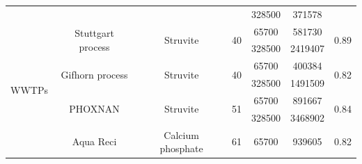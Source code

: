 \documentclass[authoryear]{elsarticle}
\begin{document}
\begin{table}[h]
{\begin{tabular}{@{}ccccccc@{}}
			&              &                    &                                                                                     & 328500                                                         & 371578                                                      &                                    \\ \cmidrule(lr){2-7}
			\multirow{10}{*}{WWTPs}                                                          & \multirow{2}{*}{Stuttgart process} & \multirow{2}{*}{Struvite}                   & \multirow{2}{*}{40}                                                                                    & 65700                                                          & 581730                                                      & \multirow{2}{*}{0.89}   \\ 
			&  &                    &                                                                                     & 328500                                                         & 2419407                                                     &                                    \\
			& \multirow{2}{*}{Gifhorn process}   & \multirow{2}{*}{Struvite}                   & \multirow{2}{*}{40}                                                                                    & 65700                                                          & 400384                                                      & \multirow{2}{*}{0.82} \\
			&     &                    &                                                                                     & 328500                                                         & 1491509                                                     &                                    \\
			& \multirow{2}{*}{PHOXNAN}           & \multirow{2}{*}{Struvite}                   & \multirow{2}{*}{51}                                                                                    & 65700                                                          & 891667                                                      & \multirow{2}{*}{0.84} \\
			&            &                    &                                                                                     & 328500                                                         & 3468902                                                     &                                    \\
			& \multirow{2}{*}{Aqua Reci}         & \multirow{2}{*}{Calcium phosphate}          & \multirow{2}{*}{61}                                                                                    & 65700                                                          & 939605                                                      & \multirow{2}{*}{0.82}  \\

\end{tabular}}
\end{table}
\end{document}
